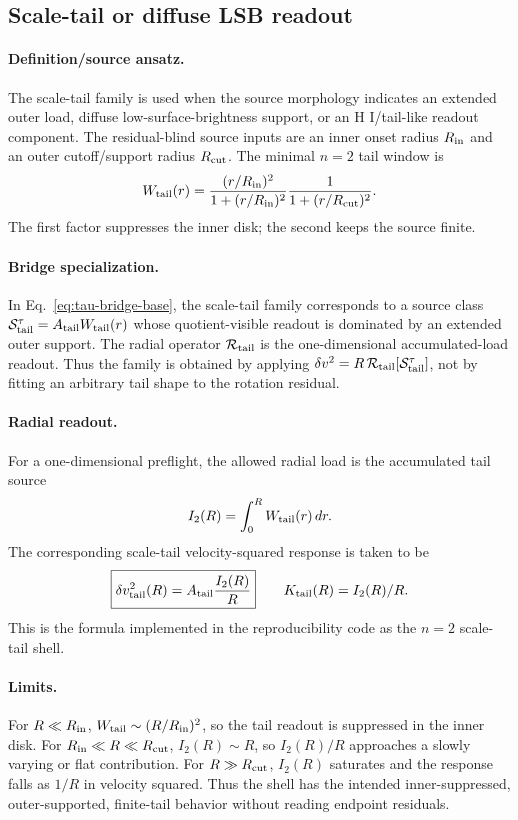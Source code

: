 \documentclass[11pt]{article}
\begin{document}
\subsection{Scale-tail or diffuse LSB readout}

\paragraph{Definition/source ansatz.}
The scale-tail family is used when the source morphology indicates an extended
outer load, diffuse low-surface-brightness support, or an H I/tail-like
readout component.  The residual-blind source inputs are an inner onset radius
\(R_{\rm in}\) and an outer cutoff/support radius \(R_{\rm cut}\).  The minimal
\(n=2\) tail window is
\[
W_{\rm tail}(r)
=
\frac{(r/R_{\rm in})^2}{1+(r/R_{\rm in})^2}
\frac{1}{1+(r/R_{\rm cut})^2}.
\]
The first factor suppresses the inner disk; the second keeps the source
finite.

\paragraph{Bridge specialization.}
In Eq.~\eqref{eq:tau-bridge-base}, the scale-tail family corresponds to a
source class \(\mathcal S_{\rm tail}^\tau=A_{\rm tail}W_{\rm tail}(r)\) whose
quotient-visible readout is dominated by an extended outer support.  The radial
operator \(\mathcal R_{\rm tail}\) is the one-dimensional accumulated-load
readout.  Thus the family is obtained by applying
\(\delta v^2=R\,\mathcal R_{\rm tail}[\mathcal S_{\rm tail}^\tau]\), not by
fitting an arbitrary tail shape to the rotation residual.

\paragraph{Radial readout.}
For a one-dimensional preflight, the allowed radial load is the accumulated
tail source
\[
I_2(R)=\int_0^R W_{\rm tail}(r)\,dr .
\]
The corresponding scale-tail velocity-squared response is taken to be
\[
\boxed{
\delta v_{\rm tail}^2(R)
=
A_{\rm tail}\frac{I_2(R)}{R}
}
\qquad
K_{\rm tail}(R)=I_2(R)/R .
\]
This is the formula implemented in the reproducibility code as the
\(n=2\) scale-tail shell.

\paragraph{Limits.}
For \(R\ll R_{\rm in}\), \(W_{\rm tail}\sim (R/R_{\rm in})^2\), so the tail
readout is suppressed in the inner disk.  For
\(R_{\rm in}\ll R\ll R_{\rm cut}\), \(I_2(R)\sim R\), so
\(I_2(R)/R\) approaches a slowly varying or flat contribution.  For
\(R\gg R_{\rm cut}\), \(I_2(R)\) saturates and the response falls as \(1/R\) in
velocity squared.  Thus the shell has the intended inner-suppressed,
outer-supported, finite-tail behavior without reading endpoint residuals.
\end{document}
